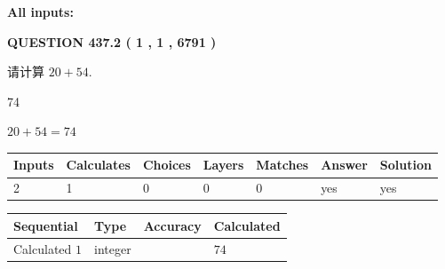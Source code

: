 \documentclass{ctexart}
\begin{document}
   
   
   
\noindent{}
   
   
   
   
\noindent\vspace{0.1in}\hspace{-0.08in} {\textbf{\Large{All inputs: }}}
   
   
  
\vspace{0.2in}
  
{\textbf{\Large{QUESTION
437.2 
 ( 1 , 1 , 6791 )
}}}
  
  
 
请计算 $ %
20 +  %
54 $.
 
 
 
\noindent{}
 
 

74
 
 
\noindent{}
 
 

 
 
 
\noindent{}
 
 

$ %
20 +  %
54=   %
74$
 
 
\noindent{}
 
 

 
   
   
   
   
\noindent\begin{tabular}{|l|l|l|l|l|l|l|}
 \hline
Inputs & Calculates & Choices & Layers & Matches & Answer & Solution \\ \hline
 2  & 
 1  & 
 0
  & 
 0  & 
 0  & 
  yes & 
  yes 
  \\ \hline
 \end{tabular}
   
   
   
   
\noindent{}
   
   
  
  
\noindent\begin{tabular}{|l|l|l|l|}
\hline
 Sequential & Type & Accuracy & Calculated \\ 
\hline
 
 
  Calculated $  1 $ & integer &  & 
  $ 74 $ 
 \\  \hline  
 \end{tabular}
   
\end{document}

